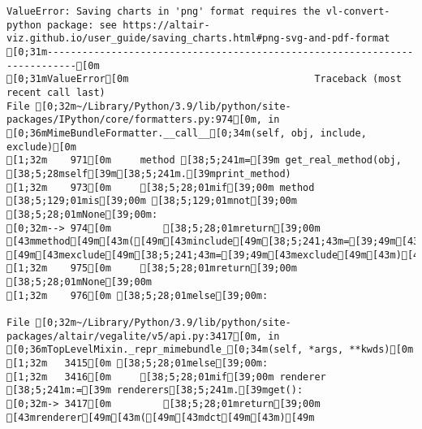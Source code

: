 \documentclass[
  letterpaper,
  DIV=11,
  numbers=noendperiod]{scrartcl}
\begin{document}
\begin{verbatim}
ValueError: Saving charts in 'png' format requires the vl-convert-python package: see https://altair-viz.github.io/user_guide/saving_charts.html#png-svg-and-pdf-format
[0;31m---------------------------------------------------------------------------[0m
[0;31mValueError[0m                                Traceback (most recent call last)
File [0;32m~/Library/Python/3.9/lib/python/site-packages/IPython/core/formatters.py:974[0m, in [0;36mMimeBundleFormatter.__call__[0;34m(self, obj, include, exclude)[0m
[1;32m    971[0m     method [38;5;241m=[39m get_real_method(obj, [38;5;28mself[39m[38;5;241m.[39mprint_method)
[1;32m    973[0m     [38;5;28;01mif[39;00m method [38;5;129;01mis[39;00m [38;5;129;01mnot[39;00m [38;5;28;01mNone[39;00m:
[0;32m--> 974[0m         [38;5;28;01mreturn[39;00m [43mmethod[49m[43m([49m[43minclude[49m[38;5;241;43m=[39;49m[43minclude[49m[43m,[49m[43m [49m[43mexclude[49m[38;5;241;43m=[39;49m[43mexclude[49m[43m)[49m
[1;32m    975[0m     [38;5;28;01mreturn[39;00m [38;5;28;01mNone[39;00m
[1;32m    976[0m [38;5;28;01melse[39;00m:

File [0;32m~/Library/Python/3.9/lib/python/site-packages/altair/vegalite/v5/api.py:3417[0m, in [0;36mTopLevelMixin._repr_mimebundle_[0;34m(self, *args, **kwds)[0m
[1;32m   3415[0m [38;5;28;01melse[39;00m:
[1;32m   3416[0m     [38;5;28;01mif[39;00m renderer [38;5;241m:=[39m renderers[38;5;241m.[39mget():
[0;32m-> 3417[0m         [38;5;28;01mreturn[39;00m [43mrenderer[49m[43m([49m[43mdct[49m[43m)[49m


\end{verbatim}
\end{document}
